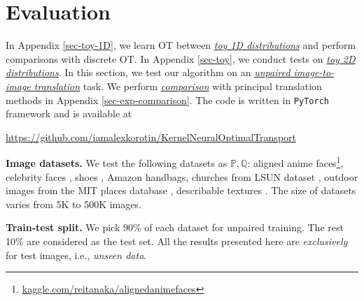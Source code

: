 \documentclass{article} %
\begin{document}




\vspace{-2mm}\section{Evaluation}
\label{sec-evaluation}
\vspace{-1mm}In Appendix \ref{sec-toy-1D}, we learn OT between \underline{\textit{toy 1D distributions}} and perform comparisons with discrete OT. In Appendix \ref{sec-toy}, we conduct tests on \underline{\textit{toy 2D distributions}}. In this section, we test our algorithm on an \underline{\textit{unpaired image-to-image translation}} task. We perform \underline{\textit{comparison}} with principal translation methods in Appendix \ref{sec-exp-comparison}. The code is written in \texttt{PyTorch} framework and is available at\vspace{-2mm}
\begin{center}
\url{https://github.com/iamalexkorotin/KernelNeuralOptimalTransport}
\end{center}

\vspace{-2mm}\textbf{Image datasets.} We test the following datasets as $\mathbb{P},\mathbb{Q}$: aligned anime faces\footnote{\url{kaggle.com/reitanaka/alignedanimefaces}}, celebrity faces \citep{liu2015faceattributes}, shoes \citep{yu2014fine}, Amazon handbags, churches from LSUN dataset \citep{yu2015lsun}, outdoor images from the MIT places database \citep{zhou2014learning}, describable textures \citep{cimpoi14describing}. The size of datasets varies from 5K to 500K images. 

\textbf{Train-test split.} We pick 90\% of each dataset for unpaired training. The rest 10\% are considered as the test set. All the results presented here are \textit{exclusively} for test images, i.e., \textit{unseen data}.
\end{document}
